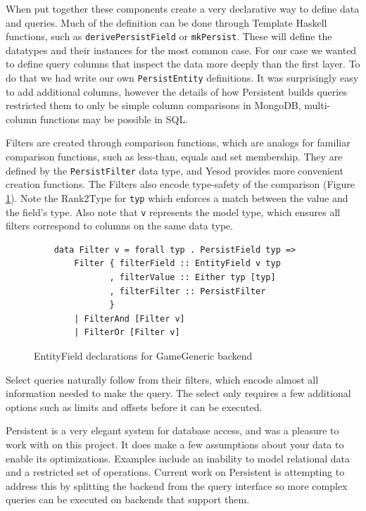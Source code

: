 \documentclass[letterpaper,twocolumn,9pt]{article}
\newcommand{\code}[1]{\texttt{#1}}
\begin{document}
When put together these components create a very declarative way to define data and queries.  Much of the definition can be done through Template Haskell functions, such as \code{derivePersistField} or \code{mkPersist}.  These will define the datatypes and their instances for the most common case.  For our case we wanted to define query columns that inspect the data more deeply than the first layer.  To do that we had write our own \code{PersistEntity} definitions.  It was surprisingly easy to add additional columns, however the details of how Persistent builds queries restricted them to only be simple column comparisons in MongoDB, multi-column functions may be possible in SQL.

Filters are created through comparison functions, which are analogs for familiar comparison functions, such as less-than, equals and set membership.  They are defined by the \code{PersistFilter} data type, and Yesod provides more convenient creation functions.  The Filters also encode type-safety of the comparison (Figure \ref{Filter}).  Note the Rank2Type for \code{typ} which enforces a match between the value and the field's type.  Also note that \code{v} represents the model type, which ensures all filters correspond to columns on the same data type.
\begin{figure}[]
\begin{verbatim}
    data Filter v = forall typ . PersistField typ => 
        Filter { filterField :: EntityField v typ
               , filterValue :: Either typ [typ]
               , filterFilter :: PersistFilter
               }
        | FilterAnd [Filter v]
        | FilterOr [Filter v]
\end{verbatim}
    \caption{EntityField declarations for GameGeneric backend}
    \label{Filter}
\end{figure}
Select queries naturally follow from their filters, which encode almost all information needed to make the query.  The select only requires a few additional options such as limits and offsets before it can be executed.

Persistent is a very elegant system for database access, and was a pleasure to work with on this project.  It does make a few assumptions about your data to enable its optimizations.  Examples include an inability to model relational data and a restricted set of operations.  Current work on Persistent is attempting to address this by splitting the backend from the query interface so more complex queries can be executed on backends that support them.
\end{document}
